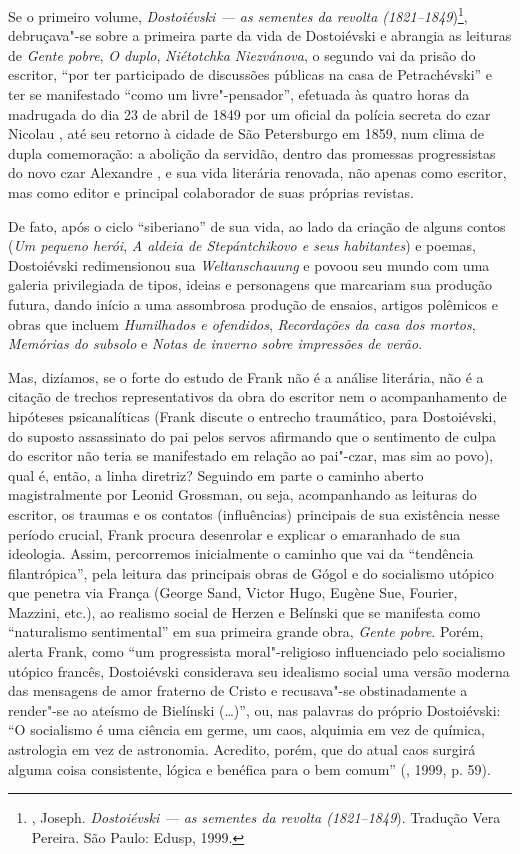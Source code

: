 Se o primeiro volume, \emph{Dostoiévski --- as sementes da revolta
(1821--1849})\footnote{, Joseph. \emph{Dostoiévski --- as sementes
  da revolta (1821--1849}). Tradução Vera Pereira. São Paulo: Edusp,
  1999.}, debruçava"-se sobre a primeira parte da vida de Dostoiévski e
abrangia as leituras de \emph{Gente pobre}, \emph{O duplo},
\emph{Niétotchka Niezvánova}, o segundo vai da prisão do escritor, ``por
ter participado de discussões públicas na casa de Petrachévski'' e ter
se manifestado ``como um livre"-pensador'', efetuada às quatro horas da
madrugada do dia 23 de abril de 1849 por um oficial da polícia secreta
do czar Nicolau , até seu retorno à cidade de São Petersburgo em 1859,
num clima de dupla comemoração: a abolição da servidão, dentro das
promessas progressistas do novo czar Alexandre , e sua vida literária
renovada, não apenas como escritor, mas como editor e principal
colaborador de suas próprias revistas.

De fato, após o ciclo ``siberiano'' de sua vida, ao lado da criação de
alguns contos (\emph{Um pequeno herói}, \emph{A aldeia de Stepántchikovo
e seus habitantes}) e poemas, Dostoiévski redimensionou sua
\emph{Weltanschauung} e povoou seu mundo com uma galeria privilegiada de
tipos, ideias e personagens que marcariam sua produção futura, dando
início a uma assombrosa produção de ensaios, artigos polêmicos e obras
que incluem \emph{Humilhados e ofendidos}, \emph{Recordações da casa dos
mortos}, \emph{Memórias do subsolo} e \emph{Notas de inverno sobre
impressões de verão}.

Mas, dizíamos, se o forte do estudo de Frank não é a análise literária,
não é a citação de trechos representativos da obra do escritor nem o
acompanhamento de hipóteses psicanalíticas (Frank discute o entrecho
traumático, para Dostoiévski, do suposto assassinato do pai pelos servos
afirmando que o sentimento de culpa do escritor não teria se manifestado
em relação ao pai"-czar, mas sim ao povo), qual é, então, a linha
diretriz? Seguindo em parte o caminho aberto magistralmente por Leonid
Grossman, ou seja, acompanhando as leituras do escritor, os traumas e os
contatos (influências) principais de sua existência nesse período
crucial, Frank procura desenrolar e explicar o emaranhado de sua
ideologia. Assim, percorremos inicialmente o caminho que vai da
``tendência filantrópica'', pela leitura das principais obras de Gógol e
do socialismo utópico que penetra via França (George Sand, Victor Hugo,
Eugène Sue, Fourier, Mazzini, etc.), ao realismo social de Herzen e
Belínski que se manifesta como ``naturalismo sentimental'' em sua
primeira grande obra, \emph{Gente pobre}. Porém, alerta Frank, como ``um
progressista moral"-religioso influenciado pelo socialismo utópico
francês, Dostoiévski considerava seu idealismo social uma versão moderna
das mensagens de amor fraterno de Cristo e recusava"-se obstinadamente a
render"-se ao ateísmo de Bielínski (\ldots{})'', ou, nas palavras do
próprio Dostoiévski: ``O socialismo é uma ciência em germe, um caos,
alquimia em vez de química, astrologia em vez de astronomia. Acredito,
porém, que do atual caos surgirá alguma coisa consistente, lógica e
benéfica para o bem comum'' (, 1999, p. 59).

